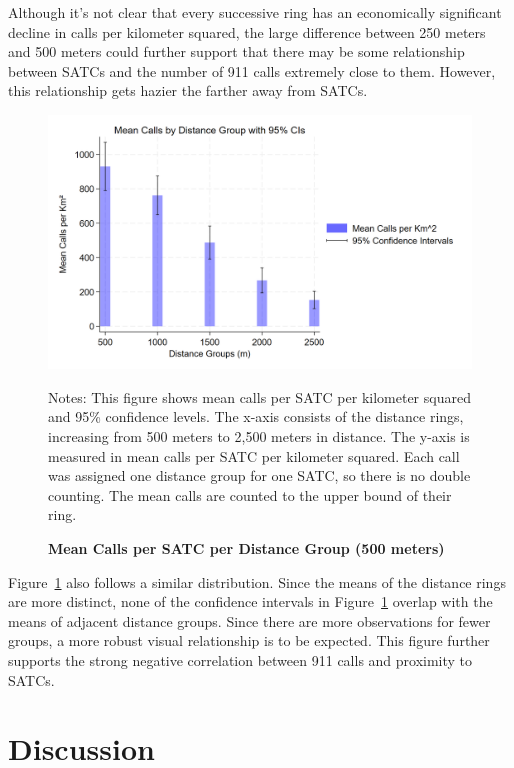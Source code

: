 \documentclass[12pt]{article}
\begin{document}
Although it's not clear that every successive ring has an economically significant decline in calls per kilometer squared, the large difference between 250 meters and 500 meters could further support that there may be some relationship between SATCs and the number of 911 calls extremely close to them. However, this relationship gets hazier the farther away from SATCs.

\begin{figure}[H]
    \centering
\includegraphics[width=0.75\linewidth]{Reproducibility Package/Downloaded_calls/Visual_Graphics_Downloaded_calls/500_CI_Graph.png}
    \caption{\textbf{Mean Calls per SATC per Distance Group (500 meters)}}
    \label{fig:Figure4}
    \centering\footnotesize{Notes: This figure shows mean calls per SATC per kilometer squared and 95\% confidence levels. The x-axis consists of the distance rings, increasing from 500 meters to 2,500 meters in distance. The y-axis is measured in mean calls per SATC per kilometer squared. Each call was assigned one distance group for one SATC, so there is no double counting. The mean calls are counted to the upper bound of their ring.}
\end{figure}

Figure~\ref{fig:Figure4} also follows a similar distribution. Since the means of the distance rings are more distinct, none of the confidence intervals in Figure~\ref{fig:Figure4} overlap with the means of adjacent distance groups. Since there are more observations for fewer groups, a more robust visual relationship is to be expected. This figure further supports the strong negative correlation between 911 calls and proximity to SATCs. 


\section{Discussion}
\label{sec:discussion}
\end{document}
